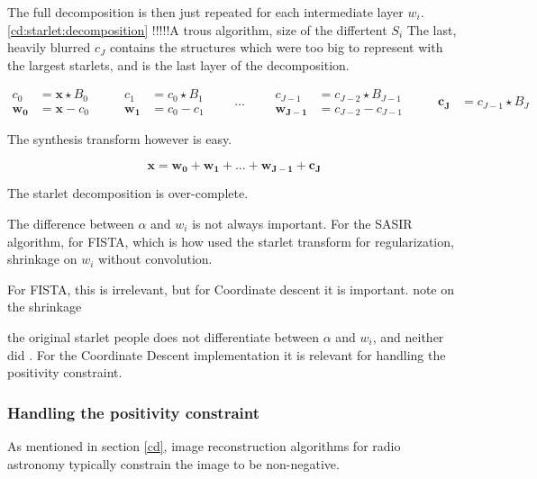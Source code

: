 The full decomposition is then just repeated for each intermediate layer $w_i$. \eqref{cd:starlet:decomposition}
!!!!!A trous algorithm, size of the differtent $S_i$
The last, heavily blurred $c_J$ contains the structures which were too big to represent with the largest starlets, and is the last layer of the decomposition.

\begin{equation}\label{cd:starlet:decomposition}
	\begin{split}
		c_0 &= \bm{x} \star B_0 \\
		\bm{w_0} &= \bm{x} - c_0
	\end{split}
	\qquad
	\begin{split}
		c_1 &= c_0 \star B_1 \\
		\bm{w_1} &= c_0 - c_1
	\end{split}
	\qquad \ldots \qquad
	\begin{split}
		c_{J-1} &= c_{J-2} \star B_{J-1} \\
		\bm{w_{J-1}} &= c_{J-2} - c_{J-1}
	\end{split}
	\qquad
	\begin{split}
		\bm{c_J} &= c_{J-1} \star B_J
	\end{split}
\end{equation}

The synthesis transform however is easy.

\begin{equation} \label{cd:starlet:backwards}
\bm{x} = \bm{w_0} + \bm{w_1} + \ldots + \bm{w_{J-1}} + \bm{c_J}
\end{equation}

The starlet decomposition is over-complete.

The difference between $\alpha$ and $w_i$ is not always important. For the SASIR algorithm,  for FISTA, which is how \cite{girard2015sparse} used the starlet transform for regularization, shrinkage on $w_i$ without convolution.

For FISTA, this is irrelevant, but for Coordinate descent it is important. note on the shrinkage


the original starlet people \cite{starck2015starlet} does not differentiate between $\alpha$ and $w_i$, and neither did \cite{girard2015sparse}. For the Coordinate Descent implementation it is relevant for handling the positivity constraint.

\subsubsection{Handling the positivity constraint}
As mentioned in section \ref{cd}, image reconstruction algorithms for radio astronomy typically constrain the image to be non-negative\cite{mcewen2011compressed}.


